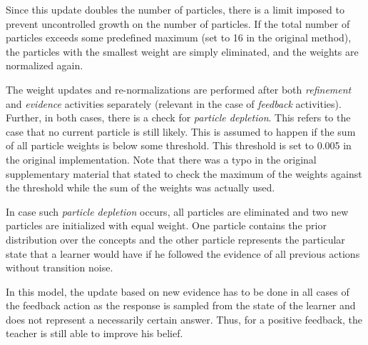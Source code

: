 Since this update doubles the number of particles, there is a limit imposed to prevent uncontrolled growth on the number of particles.
If the total number of particles exceeds some predefined maximum (set to 16 in the original method), the particles with the smallest weight are simply eliminated, and the weights are normalized again.


The weight updates and re-normalizations are performed after both \textit{refinement} and \textit{evidence} activities separately (relevant in the case of \textit{feedback} activities).
Further, in both cases, there is a check for \textit{particle depletion}.
This refers to the case that no current particle is still likely.
This is assumed to happen if the sum of all particle weights is below some threshold.
This threshold is set to 0.005 in the original implementation.
Note that there was a typo in the original supplementary material that stated to check the maximum of the weights against the threshold while the sum of the weights was actually used.

In case such \textit{particle depletion} occurs, all particles are eliminated and two new particles are initialized with equal weight.
One particle contains the prior distribution over the concepts and the other particle represents the particular state that a learner would have if he followed the evidence of all previous actions without transition noise. 

In this model, the update based on new evidence has to be done in all cases of the feedback action as the response is sampled from the state of the learner and does not represent a necessarily certain answer. Thus, for a positive feedback, the teacher is still able to improve his belief.


